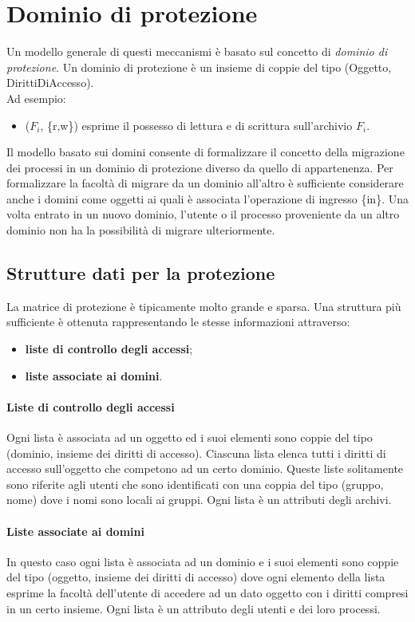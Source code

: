 \documentclass[12pt, letterpaper]{report}
\begin{document}
	\section{Dominio di protezione} Un modello generale di questi meccanismi è basato sul concetto di \textit{dominio di protezione}. Un dominio di protezione è un insieme di coppie del tipo (Oggetto, DirittiDiAccesso). \\
	Ad esempio:
	\begin{itemize}
		\item ($F_i$, \{r,w\}) esprime il possesso di lettura e di scrittura sull'archivio $F_i$.
	\end{itemize}
	Il modello basato sui domini consente di formalizzare il concetto della migrazione dei processi in un dominio di protezione diverso da quello di appartenenza. Per formalizzare la facoltà di migrare da un dominio all'altro è sufficiente considerare anche i domini come oggetti ai quali è associata l'operazione di ingresso \{in\}. Una volta entrato in un nuovo dominio, l'utente o il processo proveniente da un altro dominio non ha la possibilità di migrare ulteriormente.
	\subsection{Strutture dati per la protezione} La matrice di protezione è tipicamente molto grande e sparsa. Una struttura più sufficiente è ottenuta rappresentando le stesse informazioni attraverso:
	\begin{itemize}
		\item \textbf{liste di controllo degli accessi};
		\item \textbf{liste associate ai domini}.
	\end{itemize}
	\paragraph{Liste di controllo degli accessi} Ogni lista è associata ad un oggetto ed i suoi elementi sono coppie del tipo (dominio, insieme dei diritti di accesso). Ciascuna lista elenca tutti i diritti di accesso sull'oggetto che competono ad un certo dominio. Queste liste solitamente sono riferite agli utenti che sono identificati con una coppia del tipo (gruppo, nome) dove i nomi sono locali ai gruppi. Ogni lista è un attributi degli archivi.
	\paragraph{Liste associate ai domini} In questo caso ogni lista è associata ad un dominio e i suoi elementi sono coppie del tipo (oggetto, insieme dei diritti di accesso) dove ogni elemento della lista esprime la facoltà dell'utente di accedere ad un dato oggetto con i diritti compresi in un certo insieme. Ogni lista è un attributo degli utenti e dei loro processi.
\end{document}
